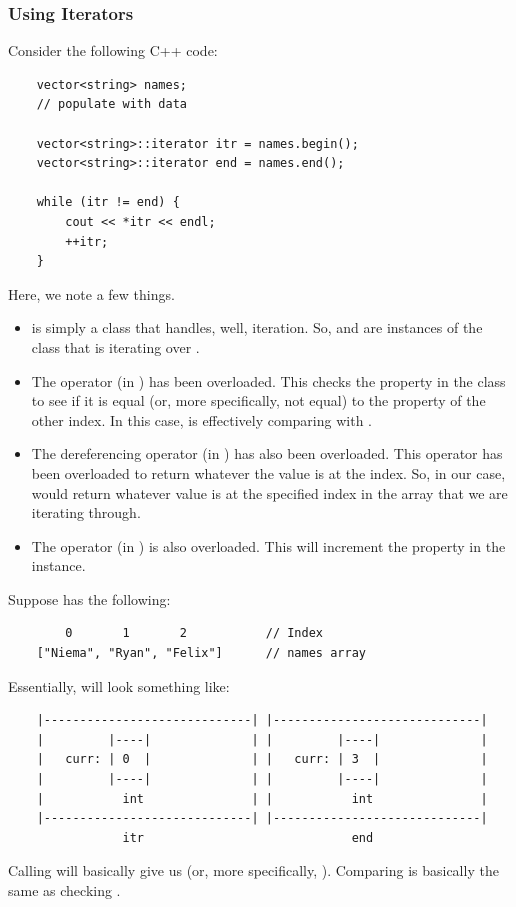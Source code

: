 \documentclass[letterpaper]{article}
\begin{document}
\subsubsection{Using Iterators}
Consider the following C++ code: 
\begin{verbatim}
    vector<string> names; 
    // populate with data 

    vector<string>::iterator itr = names.begin(); 
    vector<string>::iterator end = names.end(); 
    
    while (itr != end) {
        cout << *itr << endl; 
        ++itr; 
    }
\end{verbatim}
Here, we note a few things. 
\begin{itemize}
    \item {} is simply a class that handles, well, iteration. So,  and  are instances of the  class that is iterating over . 
    \item The \code{!=} operator (in ) has been overloaded. This checks the  property in the  class to see if it is equal (or, more specifically, not equal) to the  property of the other index. In this case,  is effectively comparing  with . 
    \item The \code{*} dereferencing operator (in ) has also been overloaded. This operator has been overloaded to return whatever the value is at the  index. So, in our case, would return whatever value is at the specified  index in the array that we are iterating through. 
    \item The \code{++} operator (in ) is also overloaded. This will increment the  property in the  instance. 
\end{itemize}

Suppose  has the following: 
\begin{verbatim}
        0       1       2           // Index 
    ["Niema", "Ryan", "Felix"]      // names array 
\end{verbatim}

Essentially,  will look something like: 
\begin{verbatim}
    |-----------------------------| |-----------------------------|
    |         |----|              | |         |----|              |
    |   curr: | 0  |              | |   curr: | 3  |              |
    |         |----|              | |         |----|              |
    |           int               | |           int               |
    |-----------------------------| |-----------------------------|
                itr                             end
\end{verbatim}
Calling  will basically give us  (or, more specifically, ). Comparing  is basically the same as checking . 
\end{document}
